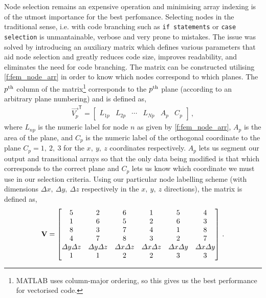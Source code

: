 Node selection remains an expensive operation and minimising array indexing is of the utmost importance for the best perfomance. Selecting nodes in the traditional sense, i.e. with code branching such as \texttt{if statements} or \texttt{case selection} is unmantainable, verbose and very prone to mistakes. The issue was solved by introducing an auxiliary matrix which defines various parameters that aid node selection and greatly reduces code size, improves readability, and eliminates the need for code branching. The matrix can be constructed utilising \cref{f:fem_node_arr} in order to know which nodes correspond to which  planes. The $ p\textsuperscript{th} $ column of the matrix\footnote{MATLAB uses column-major ordering, so this gives us the best performance for vectorised code.} corresponds to the $ p\textsuperscript{th} $ plane (according to an arbitrary plane numbering) and is defined as,
\begin{align}\label{e:surf_node_util_vec}
	\vec{V_{p}}^{\mathsf{T}} =
	\begin{bmatrix}
		L_{1p} & L_{2p} & \cdots & L_{Np} & A_{p} & C_{p}
	\end{bmatrix}\,,
\end{align}
where $ L_{np} $ is the numeric label for node $ n $ as given by \cref{f:fem_node_arr}, $ A_{p} $ is the area of the plane, and $ C_{p} $ is the numeric label of the orthogonal coordinate to the plane $ C_{p} = 1, ~2, ~3 $ for the $ x, ~y, ~z $ coordinates respectively. $ A_{p} $ lets us segment our output and transitional arrays so that the only data being modified is that which corresponds to the correct plane and $ C_{p} $ lets us know which coordinate we must use in our selection criteria. Using our particular node labelling scheme (with dimensions $ \Delta x,~ \Delta y,~ \Delta z $ respectively in the $ x,~ y,~ z $ directions), the matrix is defined as,
\begin{align}\label{e:surf_node_util}
	\mathbf{V} =
	\begin{bmatrix}
		5                 & 2                 & 6                 & 1                 & 5                 & 4                 \\
		1                 & 6                 & 5                 & 2                 & 6                 & 3                 \\
		8                 & 3                 & 7                 & 4                 & 1                 & 8                 \\
		4                 & 7                 & 8                 & 3                 & 2                 & 7                 \\
		\Delta y \Delta z & \Delta y \Delta z & \Delta x \Delta z & \Delta x \Delta z & \Delta x \Delta y & \Delta x \Delta y \\
		1                 & 1                 & 2                 & 2                 & 3                 & 3
	\end{bmatrix}\,.
\end{align}
